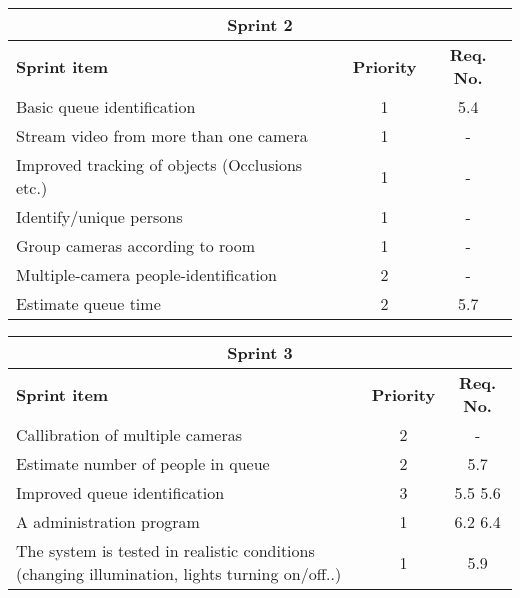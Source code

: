 \label{sprint2}
\begin{center}
	\begin{Large}
	\begin{tabular}{|p{10.5cm}|c|c|}
		\hline
		\multicolumn{3}{|c|}{\textbf{Sprint 2}} \\
		\hline
		\large{\textbf{Sprint item}} & \large{\textbf{Priority}} & \large{\textbf{Req. No.}} \\
		\hline
		\large{Basic queue identification} & \large{1} & 5.4 \\
		\hline
		\large{Stream video from more than one camera} & \large{1} & - \\
		\hline
		\large{Improved tracking of objects (Occlusions etc.)} & \large{1} & - \\
		\hline	
		\large{Identify/unique persons} & \large{1} & - \\
		\hline	
		\large{Group cameras according to room} & \large{1} & - \\
		\hline
		\large{Multiple-camera people-identification} & \large{2} & - \\
		\hline
		\large{Estimate queue time} & \large{2} & 5.7 \\
		\hline
	\end{tabular}
	\end{Large}
\end{center}



\label{sprint3}
\begin{center}
	\begin{Large}
	\begin{tabular}{|p{10.5cm}|c|c|}
		\hline
		\multicolumn{3}{|c|}{\textbf{Sprint 3}} \\
		\hline
		\large{\textbf{Sprint item}} & \large{\textbf{Priority}} & \large{\textbf{Req. No.}} \\
		\hline
		\large{Callibration of multiple cameras} & \large{2} & - \\
		\hline
		\large{Estimate number of people in queue} & \large{2} & 5.7 \\
		\hline
		\large{Improved queue identification} & \large{3} & 5.5 5.6 \\
		\hline
		\large{A administration program} & \large{1} & 6.2 6.4 \\
		\hline
		\large{The system is tested in realistic conditions (changing illumination, lights turning on/off..)} & \large{1} & 5.9 \\
		\hline
	\end{tabular}
	\end{Large}
\end{center}



